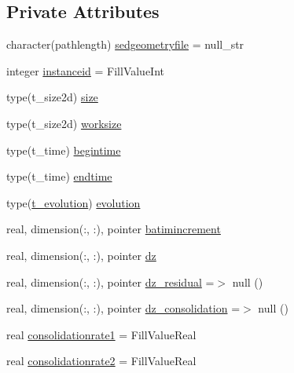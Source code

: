 \subsection*{Private Attributes}
\begin{DoxyCompactItemize}
\item 
character(pathlength) \mbox{\hyperlink{structmodulesediment_1_1t__sediment_ae1c02699c6bb34e45808fa54337ad36f}{sedgeometryfile}} = null\+\_\+str
\item 
integer \mbox{\hyperlink{structmodulesediment_1_1t__sediment_a4b79a7c117e754d20527f56f277ff6e2}{instanceid}} = Fill\+Value\+Int
\item 
type(t\+\_\+size2d) \mbox{\hyperlink{structmodulesediment_1_1t__sediment_ac4af5b3b3a646898d7fdd55c026799bb}{size}}
\item 
type(t\+\_\+size2d) \mbox{\hyperlink{structmodulesediment_1_1t__sediment_a6a83bbcf941b9e2c47fbc1cdef1d1efb}{worksize}}
\item 
type(t\+\_\+time) \mbox{\hyperlink{structmodulesediment_1_1t__sediment_a60c931120f4b78f254726b94044d0448}{begintime}}
\item 
type(t\+\_\+time) \mbox{\hyperlink{structmodulesediment_1_1t__sediment_a5539e9dfd2aeaab7638abc23089550ca}{endtime}}
\item 
type(\mbox{\hyperlink{structmodulesediment_1_1t__evolution}{t\+\_\+evolution}}) \mbox{\hyperlink{structmodulesediment_1_1t__sediment_af528fca1568d6b806dc0153b7a24a3a2}{evolution}}
\item 
real, dimension(\+:, \+:), pointer \mbox{\hyperlink{structmodulesediment_1_1t__sediment_a985b38b5487b626570cfb90ae3d1a0b5}{batimincrement}}
\item 
real, dimension(\+:, \+:), pointer \mbox{\hyperlink{structmodulesediment_1_1t__sediment_a1de9635a4cacc923a95c619d10325278}{dz}}
\item 
real, dimension(\+:, \+:), pointer \mbox{\hyperlink{structmodulesediment_1_1t__sediment_a504a9b8c2fe0cdc7226524748f169aca}{dz\+\_\+residual}} =$>$ null ()
\item 
real, dimension(\+:, \+:), pointer \mbox{\hyperlink{structmodulesediment_1_1t__sediment_a49edcbb994f27ec8166953acd13edbbe}{dz\+\_\+consolidation}} =$>$ null ()
\item 
real \mbox{\hyperlink{structmodulesediment_1_1t__sediment_a0202c624dd701da34cc7dc456d75d35b}{consolidationrate1}} = Fill\+Value\+Real
\item 
real \mbox{\hyperlink{structmodulesediment_1_1t__sediment_a1bbf6da2326fb7bbd24a28eafca0e97b}{consolidationrate2}} = Fill\+Value\+Real

\end{DoxyCompactItemize}

